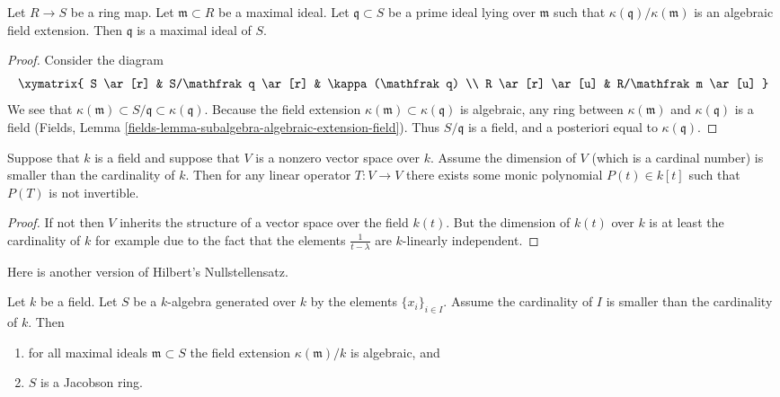 \begin{lemma}
\label{lemma-finite-residue-extension-closed}
Let $R \to S$ be a ring map.
Let $\mathfrak m \subset R$ be a maximal ideal.
Let $\mathfrak q \subset S$ be a prime ideal
lying over $\mathfrak m$ such that $\kappa(\mathfrak q)/\kappa(\mathfrak m)$
is an algebraic field extension.
Then $\mathfrak q$ is a maximal ideal of $S$.
\end{lemma}

\begin{proof}
Consider the diagram
$$
\xymatrix{
S \ar[r] & S/\mathfrak q \ar[r] & \kappa(\mathfrak q) \\
R \ar[r] \ar[u] & R/\mathfrak m \ar[u]
}
$$
We see that $\kappa(\mathfrak m) \subset S/\mathfrak q \subset
\kappa(\mathfrak q)$. Because the field extension
$\kappa(\mathfrak m) \subset \kappa(\mathfrak q)$
is algebraic, any ring between $\kappa(\mathfrak m)$
and $\kappa(\mathfrak q)$ is a field
(Fields, Lemma \ref{fields-lemma-subalgebra-algebraic-extension-field}).
Thus $S/\mathfrak q$ is a field, and a posteriori equal
to $\kappa(\mathfrak q)$.
\end{proof}

\begin{lemma}
\label{lemma-dimension}
Suppose that $k$ is a field and suppose that $V$ is a nonzero vector
space over $k$. Assume the dimension of $V$ (which is a cardinal number)
is smaller than the cardinality of $k$. Then for any linear operator
$T : V \to V$ there exists some monic polynomial $P(t) \in k[t]$ such that
$P(T)$ is not invertible.
\end{lemma}

\begin{proof}
If not then $V$ inherits the structure of a vector space over
the field $k(t)$. But the dimension of $k(t)$ over $k$ is
at least the cardinality of $k$ for example due to the fact that the elements
$\frac{1}{t - \lambda}$ are $k$-linearly independent.
\end{proof}

\noindent
Here is another version of Hilbert's Nullstellensatz.

\begin{theorem}
\label{theorem-uncountable-nullstellensatz}
Let $k$ be a field. Let $S$ be a $k$-algebra generated over $k$
by the elements $\{x_i\}_{i \in I}$. Assume the cardinality of $I$
is smaller than the cardinality of $k$. Then
\begin{enumerate}
\item for all maximal ideals $\mathfrak m \subset S$ the field
extension $\kappa(\mathfrak m)/k$
is algebraic, and
\item $S$ is a Jacobson ring.
\end{enumerate}
\end{theorem}

